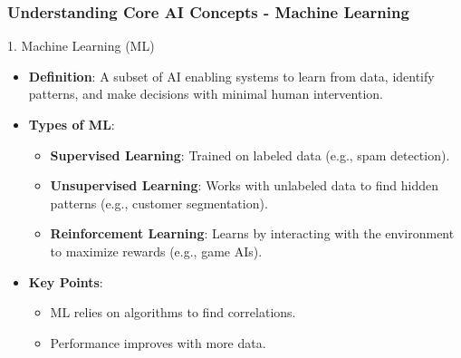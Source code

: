 \documentclass[aspectratio=169]{beamer}
\begin{document}
\begin{frame}[fragile]
    \frametitle{Understanding Core AI Concepts - Machine Learning}
    \begin{block}{1. Machine Learning (ML)}
        \begin{itemize}
            \item \textbf{Definition}: A subset of AI enabling systems to learn from data, identify patterns, and make decisions with minimal human intervention.
            \item \textbf{Types of ML}:
            \begin{itemize}
                \item \textbf{Supervised Learning}: Trained on labeled data (e.g., spam detection).
                \item \textbf{Unsupervised Learning}: Works with unlabeled data to find hidden patterns (e.g., customer segmentation).
                \item \textbf{Reinforcement Learning}: Learns by interacting with the environment to maximize rewards (e.g., game AIs).
            \end{itemize}
            \item \textbf{Key Points}:
            \begin{itemize}
                \item ML relies on algorithms to find correlations.
                \item Performance improves with more data.
            \end{itemize}
        \end{itemize}
    \end{block}
\end{frame}
\end{document}
